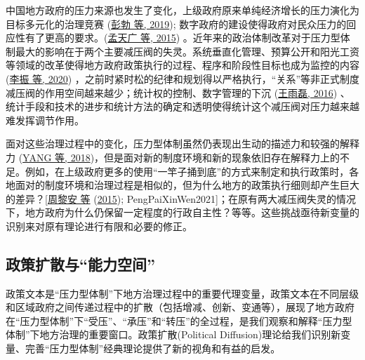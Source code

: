 \documentclass[
  12pt,
]{ctexart}
\begin{document}
中国地方政府的压力来源也发生了变化，上级政府原来单纯经济增长的压力演化为目标多元化的治理竞赛 (\protect\hyperlink{ref-PengBoZhaoJi2019}{彭勃 等, 2019}); 数字政府的建设使得政府对民众压力的回应性有了更高的要求。(\protect\hyperlink{ref-MengTianGuangLiFeng2015}{孟天广 等, 2015}) 。近年来的政治体制改革对于压力型体制最大的影响在于两个主要减压阀的失灵。系统垂直化管理、预算公开和阳光工资等领域的改革使得地方政府政策执行的过程、程序和阶段性目标也成为监控的内容 (\protect\hyperlink{ref-LiZhenEtAl2020}{李振 等, 2020}) ，之前时紧时松的纪律和规划得以严格执行，``关系''等非正式制度减压阀的作用空间越来越少；统计权的控制、数字管理的下沉 (\protect\hyperlink{ref-WangYuLei2016}{王雨磊, 2016}) 、统计手段和技术的进步和统计方法的确定和透明使得统计这个减压阀对压力越来越难发挥调节作用。

面对这些治理过程中的变化，压力型体制虽然仍表现出生动的描述力和较强的解释力 (\protect\hyperlink{ref-YangYan2018}{YANG 等, 2018})，但是面对新的制度环境和新的现象依旧存在解释力上的不足。例如，在上级政府更多的使用``一竿子捅到底''的方式来制定和执行政策时，各地面对的制度环境和治理过程是相似的，但为什么地方的政策执行细则却产生巨大的差异？{[}\protect\hyperlink{ref-ZhouLiAnEtAl2015}{周黎安 等} (\protect\hyperlink{ref-ZhouLiAnEtAl2015}{2015}); PengPaiXinWen2021{]}；在原有两大减压阀失灵的情况下，地方政府为什么仍保留一定程度的行政自主性？等等。这些挑战亟待新变量的识别来对原有理论进行有限和必要的修正。

\hypertarget{ux653fux7b56ux6269ux6563ux4e0eux80fdux529bux7a7aux95f4}{%
\subsection{政策扩散与``能力空间''}\label{ux653fux7b56ux6269ux6563ux4e0eux80fdux529bux7a7aux95f4}}

政策文本是``压力型体制''下地方治理过程中的重要代理变量，政策文本在不同层级和区域政府之间传递过程中的扩散（包括增减、创新、变通等），展现了地方政府在``压力型体制''下``受压''、``承压''和``转压''的全过程，是我们观察和解释``压力型体制''下地方治理的重要窗口。政策扩散(Political Diffusion)理论给我们识别新变量、完善``压力型体制''经典理论提供了新的视角和有益的启发。
\end{document}
